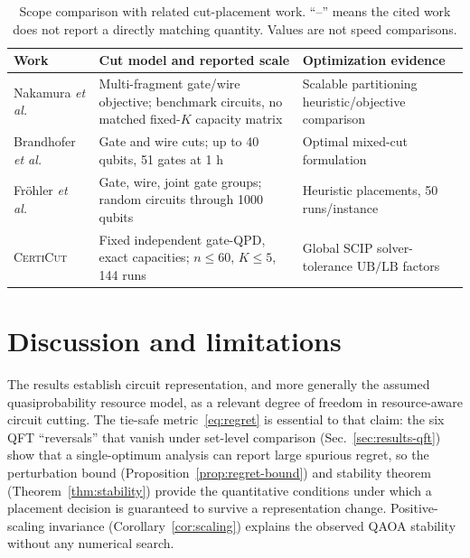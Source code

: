 \documentclass[
  aps,
  pra,
  reprint,
  amsmath,
  amssymb,
  longbibliography,
  nofootinbib,
  floatfix
]{revtex4-2}
\theoremstyle{plain}
\newcommand{\CertiCut}{\textsc{CertiCut}}
\newcommand{\LB}{\mathrm{LB}}
\newcommand{\UB}{\mathrm{UB}}
\begin{document}
\begin{table}[t]
\centering
\caption{Scope comparison with related cut-placement work. ``--'' means the cited work does not report a directly matching quantity. Values are not speed comparisons.}
\label{tab:scope-comparison}
\footnotesize
\setlength{\tabcolsep}{2pt}
\begin{tabular}{p{}p{}p{}}
\toprule
\textbf{Work} & \textbf{Cut model and reported scale} & \textbf{Optimization evidence}\\
\midrule
Nakamura \emph{et al.}~\cite{nakamura2025} & Multi-fragment gate/wire objective; benchmark circuits, no matched fixed-$K$ capacity matrix & Scalable partitioning heuristic/objective comparison\\
Brandhofer \emph{et al.}~\cite{brandhofer2024} & Gate and wire cuts; up to 40 qubits, 51 gates at 1 h & Optimal mixed-cut formulation\\
Fr{\"o}hler \emph{et al.}~\cite{frohler2026} & Gate, wire, joint gate groups; random circuits through 1000 qubits & Heuristic placements, 50 runs/instance\\
\CertiCut{} & Fixed independent gate-QPD, exact capacities; $n\le60$, $K\le5$, 144 runs & Global SCIP solver-tolerance $\UB/\LB$ factors\\
\bottomrule
\end{tabular}
\end{table}

\section{Discussion and limitations}
\label{sec:discussion}

The results establish circuit representation, and more generally the assumed quasiprobability resource model, as a relevant degree of freedom in resource-aware circuit cutting. The tie-safe metric~\eqref{eq:regret} is essential to that claim: the six QFT ``reversals'' that vanish under set-level comparison (Sec.~\ref{sec:results-qft}) show that a single-optimum analysis can report large spurious regret, so the perturbation bound (Proposition~\ref{prop:regret-bound}) and stability theorem (Theorem~\ref{thm:stability}) provide the quantitative conditions under which a placement decision is guaranteed to survive a representation change. Positive-scaling invariance (Corollary~\ref{cor:scaling}) explains the observed QAOA stability without any numerical search.
\end{document}
